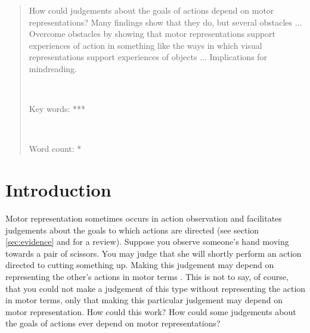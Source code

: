 \documentclass[12pt,\papersize]{extarticle}
\begin{document}
\setlength\footnotesep{1em}


\maketitle
\title{}


\begin{abstract}
\noindent
%
How could judgements about the goals of actions depend on motor representations? Many findings show that they do, but several obstacles ... Overcome obstacles by showing that motor representations support experiences of action in something like the ways in which visual representations support experiences of objects ... Implications for mindreading.
%

\ %

\noindent
Key words: ***

\ %

\noindent
Word count: *
\end{abstract}









\section{Introduction}

Motor representation sometimes occurs in action observation and facilitates judgements about the goals to which actions are directed (see section \vref{sec:evidence} and \citealp{rizzolatti_functional_2010} for a review). 
Suppose you observe someone's hand moving towards a pair of scissors. 
You may judge that she will shortly perform an action directed to cutting something up. 
Making this judgement may depend on representing the other's actions in motor terms \citep{boria:2009_intention, ortigue:2010_understanding}.  
This is not to say, of course, that you could not make a judgement of this type without representing the action in motor terms, only that making this particular judgement may depend on motor representation. 
How could this work? 
How could some judgements about the goals of actions ever depend on motor representations?
\end{document}
